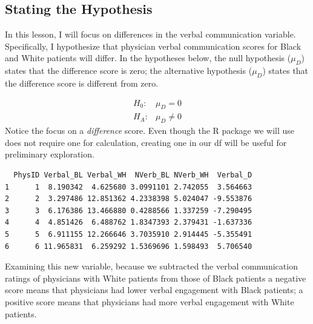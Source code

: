 \documentclass[
  11pt,
]{book}
\newenvironment{Shaded}{\begin{snugshade}}{\end{snugshade}}
\newcommand{\CommentTok}[1]{\textcolor[rgb]{0.56,0.35,0.01}{\textit{#1}}}
\newcommand{\FunctionTok}[1]{\textcolor[rgb]{0.00,0.00,0.00}{#1}}
\newcommand{\NormalTok}[1]{#1}
\newcommand{\OtherTok}[1]{\textcolor[rgb]{0.56,0.35,0.01}{#1}}
\newcommand{\SpecialCharTok}[1]{\textcolor[rgb]{0.00,0.00,0.00}{#1}}
\begin{document}
\hypertarget{stating-the-hypothesis-2}{%
\subsection{Stating the Hypothesis}\label{stating-the-hypothesis-2}}

In this lesson, I will focus on differences in the verbal communication variable. Specifically, I hypothesize that physician verbal communication scores for Black and White patients will differ. In the hypotheses below, the null hypothesis (\(\mu_D\)) states that the difference score is zero; the alternative hypothesis (\(\mu_D\)) states that the difference score is different from zero.

\[
\begin{array}{ll}
H_0: & \mu_D = 0  \\
H_A: & \mu_D \neq 0
\end{array}
\]
Notice the focus on a \emph{difference} score. Even though the R package we will use does not require one for calculation, creating one in our df will be useful for preliminary exploration.

\begin{Shaded}
\end{Shaded}

\begin{verbatim}
  PhysID Verbal_BL Verbal_WH  NVerb_BL NVerb_WH  Verbal_D
1      1  8.190342  4.625680 3.0991101 2.742055  3.564663
2      2  3.297486 12.851362 4.2338398 5.024047 -9.553876
3      3  6.176386 13.466880 0.4288566 1.337259 -7.290495
4      4  4.851426  6.488762 1.8347393 2.379431 -1.637336
5      5  6.911155 12.266646 3.7035910 2.914445 -5.355491
6      6 11.965831  6.259292 1.5369696 1.598493  5.706540
\end{verbatim}

Examining this new variable, because we subtracted the verbal communication ratings of physicians with White patients from those of Black patients a negative score means that physicians had lower verbal engagement with Black patients; a positive score means that physicians had more verbal engagement with White patients.
\end{document}

